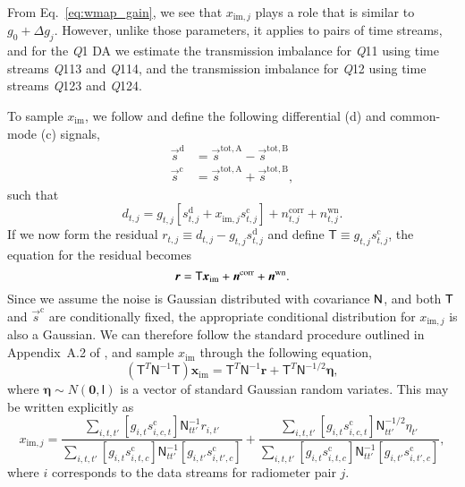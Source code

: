\documentclass[twocolumn]{aa}
\newcommand{\n}[0]{\vec{n}}
\newcommand{\s}[0]{\vec{s}}
\newcommand{\T}[0]{\tens{T}}
\newcommand{\N}[0]{\tens{N}}
\renewcommand{\r}[0]{\vec{r}}
\newcommand{\Q}[0]{\textit Q}
\begin{document}
From Eq.~\eqref{eq:wmap_gain}, we see that $x_{\mathrm{im},j}$ plays a role that is
similar to $g_0+\Delta g_j$. However, unlike those parameters, it applies to
pairs of time streams, and for the \Q1 DA we estimate the transmission
imbalance for \Q11 using time streams \Q113 and \Q114, and the transmission
imbalance for \Q12 using time streams \Q123 and \Q124.

To sample $x_\mathrm{im}$, we follow \citet{hinshaw2003a} and define
the following differential (d) and common-mode (c) signals,
\begin{align}
	\vec s^\mathrm{d}&=\vec s^\mathrm{tot,A}-\vec s^\mathrm{tot,B}
	\\
	\vec s^\mathrm{c}&=\vec s^\mathrm{tot,A}+\vec s^\mathrm{tot,B},
\end{align}
such that
\begin{equation}
	d_{t,j}=g_{t,j}[s_{t,j}^\mathrm d
	+x_{\mathrm{im},j}^{\phantom{c}}s_{t,j}^\mathrm c]
	+n_{t,j}^\mathrm{corr}+n_{t,j}^\mathrm{wn}.
        \label{eq:data_tod}
\end{equation}
If we now form the residual $r_{t,j}\equiv
d_{t,j}-g_{t,j}^{\phantom{d}}s_{t,j}^\mathrm d$ and define ${\mathsf T\equiv
g_{t,j}^{\phantom{c}}s_{t,j}^\mathrm{c}}$, the equation for the residual becomes
\begin{equation}
	\r=\T \boldsymbol x_{\mathrm{im}}
	+\n^\mathrm{corr}+\n^\mathrm{wn}.
\end{equation}
Since we assume the noise is Gaussian distributed with covariance
$\N$, and both $\T$ and $\s^{\mathrm{c}}$ are conditionally fixed, 
the appropriate conditional distribution for $x_{\mathrm{im},j}$
is also a Gaussian. We can therefore follow the standard procedure
outlined in Appendix~A.2 of
\citet{bp01}, and sample $x_\mathrm{im}$ through the following equation,
\begin{equation}
	(\mathsf T^T\mathsf N^{-1}\mathsf T)\boldsymbol x_\mathrm{im}
	=\mathsf T^T\mathsf N^{-1}\boldsymbol r
	+\mathsf T^T\mathsf N^{-1/2}\boldsymbol\eta,
\end{equation}
where $\boldsymbol \eta \sim N(\boldsymbol 0,\mathsf I)$ is a vector of standard Gaussian random
variates. This may be written explicitly as
\begin{equation}
  \label{eq:imbalsamp}
  x_{\mathrm{im},j}=
  \frac{\sum_{i,t,t'}[g_{i,t}s_{i,c,t}^\mathrm{c}]
  \mathsf N^{-1}_{tt'}r_{i,t'}}
  {\sum_{i,t,t'}[g_{i,t}s_{i,t,c}^\mathrm{c}]
  \mathsf N^{-1}_{tt'}[g_{i,t'}s_{i,t',c}^\mathrm{c}]}
  +
  \frac{\sum_{i,t,t'}[g_{i,t}s_{i,c,t}^\mathrm{c}]
  \mathsf N^{-1/2}_{tt'}\eta_{t'}}
  {\sum_{i,t,t'}[g_{i,t}s_{i,t,c}^\mathrm{c}]
  \mathsf N^{-1}_{tt'}[g_{i,t'}s_{i,t',c}^\mathrm{c}]},\nonumber
\end{equation}
where $i$ corresponds to the data streams for radiometer pair $j$. 
\end{document}
